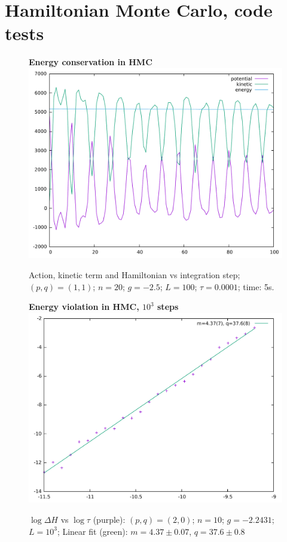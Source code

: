\documentclass[12pt,a4paper]{article}
\begin{document}
\section{Hamiltonian Monte Carlo, code tests}

\begin{figure}[hp]
\centering
\textbf{Energy conservation in HMC}
\includegraphics[width=1\linewidth]{env.pdf}
\caption{Action, kinetic term and Hamiltonian vs integration step; $(p,q)=(1,1)$; $n=20$; $g=-2.5$; $L=100$; $\tau = 0.0001$; time: 5s.}
\end{figure}

\newpage

\begin{figure}[hp]
\centering
\textbf{Energy violation in HMC, $10^3$ steps}
\includegraphics[width=1\linewidth]{quadratic103.pdf}
\caption{$\log \Delta H$ vs $\log \tau$ (purple): $(p,q)=(2,0)$; $n=10$; $g=-2.2431$; $L=10^3$; Linear fit (green): $m=4.37 \pm 0.07$, $q = 37.6 \pm 0.8$}
\end{figure}
\end{document}
